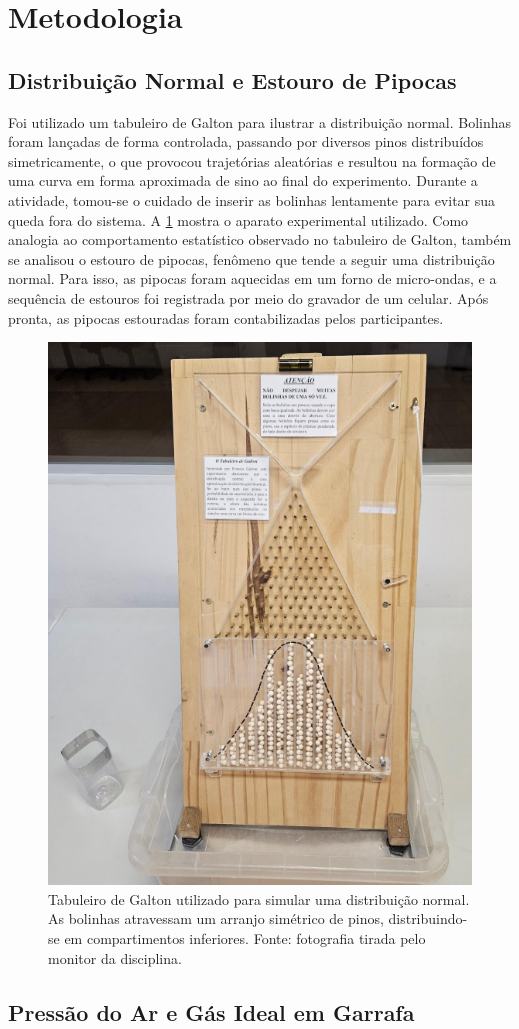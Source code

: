 \section{Metodologia}

\subsection{Distribuição Normal e Estouro de Pipocas}

Foi utilizado um tabuleiro de Galton para ilustrar a distribuição normal. Bolinhas foram lançadas de forma controlada, passando por diversos pinos distribuídos simetricamente, o que provocou trajetórias aleatórias e resultou na formação de uma curva em forma aproximada de sino ao final do experimento. Durante a atividade, tomou-se o cuidado de inserir as bolinhas lentamente para evitar sua queda fora do sistema. A \cref{fig:galton} mostra o aparato experimental utilizado.
Como analogia ao comportamento estatístico observado no tabuleiro de Galton, também se analisou o estouro de pipocas, fenômeno que tende a seguir uma distribuição normal. Para isso, as pipocas foram aquecidas em um forno de micro-ondas, e a sequência de estouros foi registrada por meio do gravador de um celular. Após pronta, as pipocas estouradas foram contabilizadas pelos participantes.

\begin{figure}[H]
\centering
\includegraphics[width=0.35\linewidth]{fig/galton.png}
\caption{Tabuleiro de Galton utilizado para simular uma distribuição normal. As bolinhas atravessam um arranjo simétrico de pinos, distribuindo-se em compartimentos inferiores. Fonte: fotografia tirada pelo monitor da disciplina.}
\label{fig:galton}
\end{figure}

\subsection{Pressão do Ar e Gás Ideal em Garrafa}

